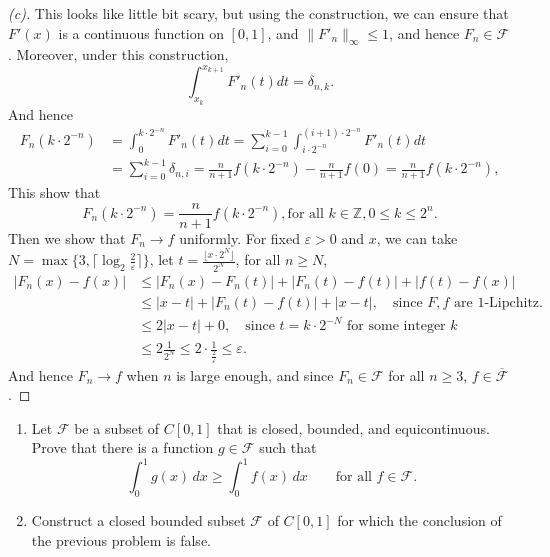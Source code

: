 \begin{proof}[(c)]
    This looks like little bit scary, but using the construction, we can ensure that $F'(x)$ is a continuous function on $[0,1]$, and $\| F'_n\|_\infty \le 1$, and hence $F_n \in \mathcal F$. Moreover, under this construction, 
    \[
        \int_{x_k}^{x_{k+1}}F'_n(t)dt = \delta_{n,k}.
    \]
    And hence 
    \[
        \begin{aligned}
            F_n(k \cdot 2^{-n}) &= \int_0^{k \cdot 2^{-n}} F'_n(t) dt = \sum_{i=0}^{k-1} \int_{i \cdot 2^{-n}}^{(i+1) \cdot 2^{-n}} F'_n(t) dt \\
            &=\sum_{i=0}^{k-1} \delta_{n,i} = \frac{n}{n+1}f(k \cdot 2^{-n}) - \frac{n}{n+1}f(0) = \frac{n}{n+1}f(k \cdot 2^{-n}),
        \end{aligned}
    \]
    This show that 
    \[
        F_n(k \cdot 2^{-n}) = \frac{n}{n+1}f(k \cdot 2^{-n}), \text{for all } k\in \mathbb{Z}, 0 \le k \le 2^n.
    \]
    Then we show that $F_n \to f$ uniformly. For fixed $\varepsilon > 0$ and $x$, we can take $N = \max\{3, \lceil \log_{2}{\frac{2}{\varepsilon}} \rceil\}$, let $t = \frac{\lfloor x \cdot 2^N \rfloor }{2^N}$, for all $n \ge N$,
    \[
        \begin{aligned}
            \lvert F_n(x) - f(x)\rvert &\le \lvert F_n(x) - F_n(t) \rvert + \lvert F_n(t) - f(t)\rvert + \lvert f(t) - f(x)\rvert \\
            &\le \lvert x-t \rvert + \lvert F_n(t) - f(t)\rvert + \lvert x-t\rvert ,\quad {\text{since $F, f$ are 1-Lipchitz}}. \\
            &\le 2\lvert x-t \rvert + 0, \quad \text{since $t = k \cdot 2^{-N}$ for some integer $k$} \\
            &\le 2 \frac{1}{2^N} \le 2 \cdot \frac{1}{\frac{2}{\varepsilon}} \le \varepsilon.
        \end{aligned}
    \]
    And hence $F_n \to f$ when $n$ is large enough, and since $F_n \in \mathcal F$ for all $n \ge 3$, $f \in \overline{\mathcal F}$.
    
\end{proof}

\begin{problem}

    \vphantom{}
    \begin{enumerate}
    \item[(a)] Let \(\mathcal{F}\) be a subset of \(C[0,1]\) that is closed,
    bounded, and equicontinuous. Prove that there is a function
    \(g\in\mathcal{F}\) such that
    \[
    \int_0^1 g(x)\,dx
    \ge
    \int_0^1 f(x)\,dx
    \qquad
    \text{for all } f\in\mathcal{F}.
    \]
    
    \item[(b)] Construct a closed bounded subset \(\mathcal{F}\) of \(C[0,1]\)
    for which the conclusion of the previous problem is false.
    \end{enumerate}
    
\end{problem}

